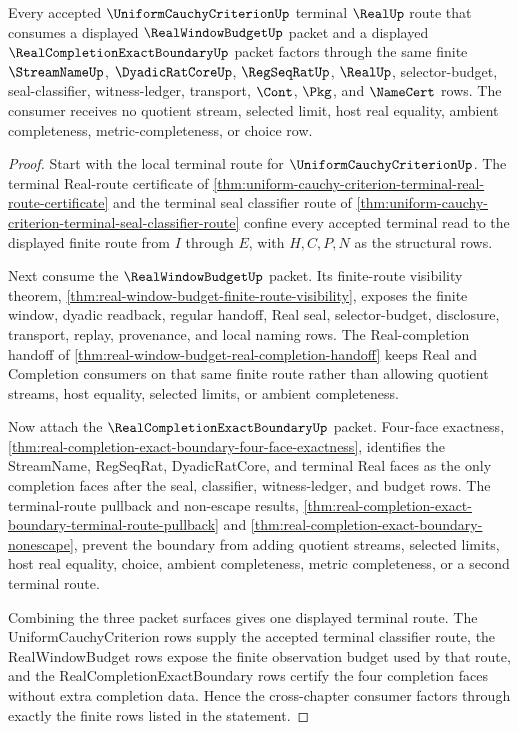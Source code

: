 
\begin{theorem}
\label{thm:uniform-cauchy-criterion-realwindowbudget-terminal-route}
Every accepted $\UniformCauchyCriterionUp$ terminal $\RealUp$ route that consumes a displayed $\RealWindowBudgetUp$ packet and a displayed $\RealCompletionExactBoundaryUp$ packet factors through the same finite $\StreamNameUp$, $\DyadicRatCoreUp$, $\RegSeqRatUp$, $\RealUp$, selector-budget, seal-classifier, witness-ledger, transport, $\Cont$, $\Pkg$, and $\NameCert$ rows. The consumer receives no quotient stream, selected limit, host real equality, ambient completeness, metric-completeness, or choice row.
\end{theorem}
\begin{proof}
Start with the local terminal route for $\UniformCauchyCriterionUp$. The terminal Real-route certificate of \autoref{thm:uniform-cauchy-criterion-terminal-real-route-certificate} and the terminal seal classifier route of \autoref{thm:uniform-cauchy-criterion-terminal-seal-classifier-route} confine every accepted terminal read to the displayed finite route from $I$ through $E$, with $H,C,P,N$ as the structural rows.

Next consume the $\RealWindowBudgetUp$ packet. Its finite-route visibility theorem, \autoref{thm:real-window-budget-finite-route-visibility}, exposes the finite window, dyadic readback, regular handoff, Real seal, selector-budget, disclosure, transport, replay, provenance, and local naming rows. The Real-completion handoff of \autoref{thm:real-window-budget-real-completion-handoff} keeps Real and Completion consumers on that same finite route rather than allowing quotient streams, host equality, selected limits, or ambient completeness.

Now attach the $\RealCompletionExactBoundaryUp$ packet. Four-face exactness, \autoref{thm:real-completion-exact-boundary-four-face-exactness}, identifies the StreamName, RegSeqRat, DyadicRatCore, and terminal Real faces as the only completion faces after the seal, classifier, witness-ledger, and budget rows. The terminal-route pullback and non-escape results, \autoref{thm:real-completion-exact-boundary-terminal-route-pullback} and \autoref{thm:real-completion-exact-boundary-nonescape}, prevent the boundary from adding quotient streams, selected limits, host real equality, choice, ambient completeness, metric completeness, or a second terminal route.

Combining the three packet surfaces gives one displayed terminal route. The UniformCauchyCriterion rows supply the accepted terminal classifier route, the RealWindowBudget rows expose the finite observation budget used by that route, and the RealCompletionExactBoundary rows certify the four completion faces without extra completion data. Hence the cross-chapter consumer factors through exactly the finite rows listed in the statement.
\end{proof}

